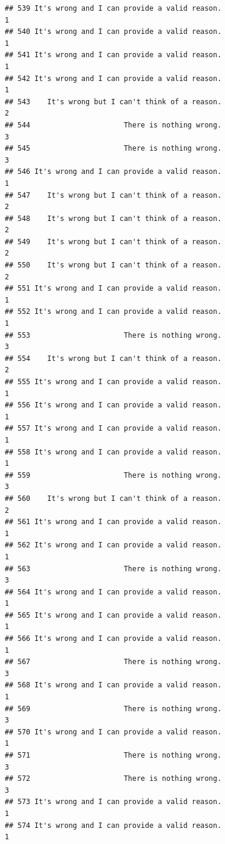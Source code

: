 \documentclass[
  american,
  man,floatsintext]{apa7}
\begin{document}
\begin{verbatim}
## 539 It's wrong and I can provide a valid reason.                    1
## 540 It's wrong and I can provide a valid reason.                    1
## 541 It's wrong and I can provide a valid reason.                    1
## 542 It's wrong and I can provide a valid reason.                    1
## 543    It's wrong but I can't think of a reason.                    2
## 544                      There is nothing wrong.                    3
## 545                      There is nothing wrong.                    3
## 546 It's wrong and I can provide a valid reason.                    1
## 547    It's wrong but I can't think of a reason.                    2
## 548    It's wrong but I can't think of a reason.                    2
## 549    It's wrong but I can't think of a reason.                    2
## 550    It's wrong but I can't think of a reason.                    2
## 551 It's wrong and I can provide a valid reason.                    1
## 552 It's wrong and I can provide a valid reason.                    1
## 553                      There is nothing wrong.                    3
## 554    It's wrong but I can't think of a reason.                    2
## 555 It's wrong and I can provide a valid reason.                    1
## 556 It's wrong and I can provide a valid reason.                    1
## 557 It's wrong and I can provide a valid reason.                    1
## 558 It's wrong and I can provide a valid reason.                    1
## 559                      There is nothing wrong.                    3
## 560    It's wrong but I can't think of a reason.                    2
## 561 It's wrong and I can provide a valid reason.                    1
## 562 It's wrong and I can provide a valid reason.                    1
## 563                      There is nothing wrong.                    3
## 564 It's wrong and I can provide a valid reason.                    1
## 565 It's wrong and I can provide a valid reason.                    1
## 566 It's wrong and I can provide a valid reason.                    1
## 567                      There is nothing wrong.                    3
## 568 It's wrong and I can provide a valid reason.                    1
## 569                      There is nothing wrong.                    3
## 570 It's wrong and I can provide a valid reason.                    1
## 571                      There is nothing wrong.                    3
## 572                      There is nothing wrong.                    3
## 573 It's wrong and I can provide a valid reason.                    1
## 574 It's wrong and I can provide a valid reason.                    1

\end{verbatim}
\end{document}
